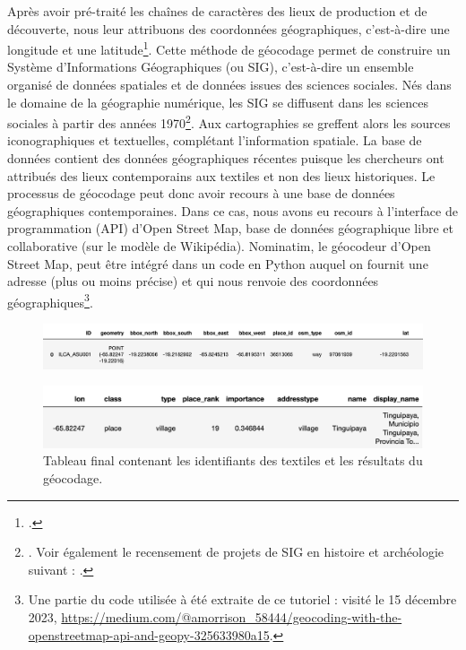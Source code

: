 Après avoir pré-traité les chaînes de caractères des lieux de production et de découverte, nous leur attribuons des coordonnées géographiques, c'est-à-dire une longitude et une latitude\footcite[p.~34]{goldbergTextGeographicCoordinates2007}. Cette méthode de géocodage permet de construire un Système d'Informations Géographiques (ou SIG), c'est-à-dire un ensemble organisé de données spatiales et de données issues des sciences sociales. Nés dans le domaine de la géographie numérique, les SIG se diffusent dans les sciences sociales à partir des années 1970\footnote{\cite[par.~3]{brandoIntroductionHumanitesNumeriques2021}. Voir également le recensement de projets de SIG en histoire et archéologie suivant : \cite{abaranesBibliographieAnalyseSpatiale2021}.}. Aux cartographies se greffent alors les sources iconographiques et textuelles, complétant l'information spatiale.
La base de données contient des données géographiques récentes puisque les chercheurs  ont attribués des lieux contemporains aux textiles et non des lieux historiques. Le processus de géocodage peut donc avoir recours à une base de données géographiques contemporaines. 
Dans ce cas, nous avons eu recours à l'interface de programmation (API) d'Open Street Map, base de données géographique libre et collaborative (sur le modèle de Wikipédia). Nominatim, le géocodeur d'Open Street Map, peut être intégré dans un code en Python auquel on fournit une adresse (plus ou moins précise) et qui nous renvoie des coordonnées géographiques\footnote{Une partie du code utilisée à été extraite de ce tutoriel : visité le 15 décembre 2023, \url{https://medium.com/@amorrison_58444/geocoding-with-the-openstreetmap-api-and-geopy-325633980a15}.}. 

 \begin{figure}[!h]
	\begin{center}
		\includegraphics[width=15cm]{../images/gdf_places_prod.png}
	 \end{center}
\end{figure}
 \begin{figure}[!h]
	\begin{center}
		\includegraphics[width=12cm]{../images/gdf_places_prod2.png}
	 \end{center}
	 \caption{Tableau final contenant les identifiants des textiles et les résultats du géocodage.}
	 \label{fig:gdf_places_prod}
\end{figure}


